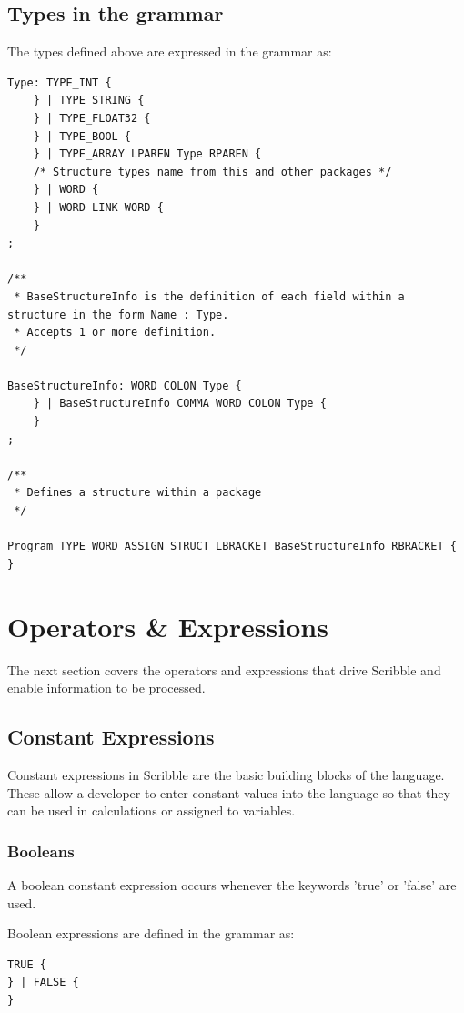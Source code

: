 \documentclass[]{final_report}
\begin{document}
\subsection{Types in the grammar}

The types defined above are expressed in the grammar as:
\begin{verbatim}
Type: TYPE_INT {
	} | TYPE_STRING {
	} | TYPE_FLOAT32 {
	} | TYPE_BOOL {
	} | TYPE_ARRAY LPAREN Type RPAREN {
	/* Structure types name from this and other packages */	
	} | WORD {
	} | WORD LINK WORD {
	}
;

/**
 * BaseStructureInfo is the definition of each field within a structure in the form Name : Type.
 * Accepts 1 or more definition.
 */

BaseStructureInfo: WORD COLON Type {		
	} | BaseStructureInfo COMMA WORD COLON Type {
	}
;

/**
 * Defines a structure within a package
 */
 
Program TYPE WORD ASSIGN STRUCT LBRACKET BaseStructureInfo RBRACKET {
}

\end{verbatim}

\section{Operators \& Expressions}

The next section covers the operators and expressions that drive Scribble and enable information to be processed.

\subsection{Constant Expressions}

Constant expressions in Scribble are the basic building blocks of the language. These allow a developer to enter constant values into the language so that they can be used in calculations or assigned to variables.

\subsubsection{Booleans}

A boolean constant expression occurs whenever the keywords 'true' or 'false' are used.

Boolean expressions are defined in the grammar as:
\begin{verbatim}
TRUE {
} | FALSE {
}\end{verbatim}
\end{document}
